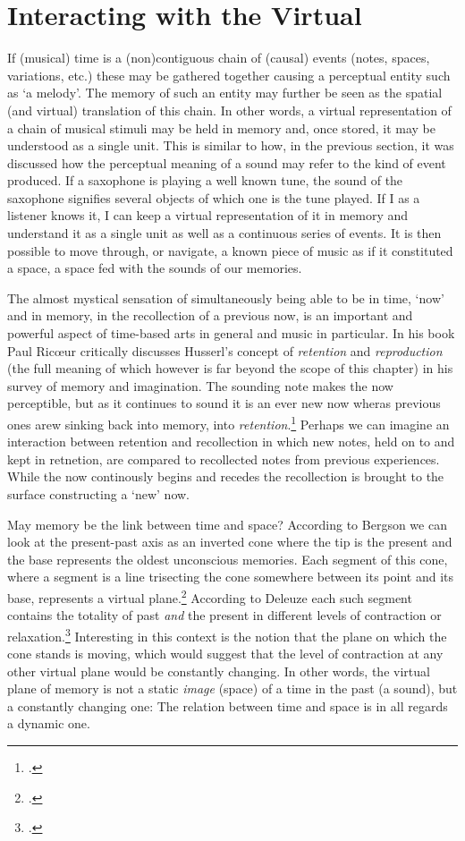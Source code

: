 
\section*{Interacting with the Virtual}
\label{sec:inter-with-virt}

If (musical) time is a (non)contiguous chain of (causal) events (notes, spaces, variations, etc.) these may be gathered together causing a perceptual entity such as `a melody'. The memory of such an entity may further be seen as the spatial (and virtual) translation of this chain. In other words, a virtual representation of a chain of musical stimuli may be held in memory and, once stored, it may be understood as a single unit. This is similar to how, in the previous section, it was discussed how the perceptual meaning of a sound may refer to the kind of event produced. If a saxophone is playing a well known tune, the sound of the saxophone signifies several objects of which one is the tune played. If I as a listener knows it, I can keep a virtual representation of it in memory and understand it as a single unit as well as a continuous series of events. It is then possible to move through, or navigate, a known piece of music as if it constituted a space, a space fed with the sounds of our memories. 

The almost mystical sensation of simultaneously being able to be in time, `now' and in memory, in the recollection of a previous now, is an important and powerful aspect of time-based arts in general and music in particular. In his book  Paul Ric{\oe}ur critically discusses Husserl's concept of \emph{retention} and \emph{reproduction} (the full meaning of which however is far beyond the scope of this chapter) in his survey of memory and imagination. The sounding note makes the now perceptible, but as it continues to sound it is an ever new now wheras previous ones arew sinking back into memory, into \emph{retention}.\footcite[Part 1, Ch. 1:4]{ricoeur04} Perhaps we can imagine an interaction between retention and recollection in which new notes, held on to and kept in retnetion, are compared to recollected notes from previous experiences. While the now continously begins and recedes the recollection is brought to the surface constructing a `new' now.

May memory be the link between time and space? According to Bergson we can look at the present-past axis as an inverted cone where the tip is the present and the base represents the oldest unconscious memories. Each segment of this cone, where a segment is a line trisecting the cone somewhere between its point and its base, represents a virtual plane.\footcite[][Ch.3]{bergson91} According to Deleuze each such segment contains the totality of past \emph{and} the present in different levels of contraction or relaxation.\footcite[][60]{deleuze88} Interesting in this context is the notion that the plane on which the cone stands is moving, which would suggest that the level of contraction at any other virtual plane would be constantly changing. In other words, the virtual plane of memory is not a static \emph{image} (space) of a time in the past (a sound), but a constantly changing one: The relation between time and space is in all regards a dynamic one.


